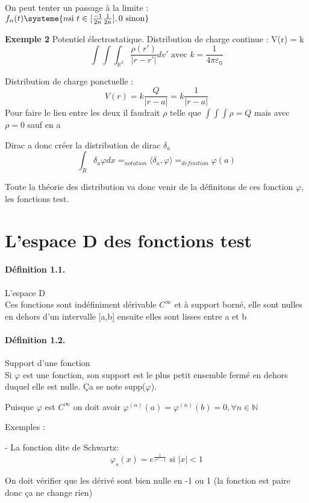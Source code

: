 \documentclass[12pt,a4paper]{report}
\begin{document}
On peut tenter un passage à la limite :\\
\(f_n(t) \systeme{n \text{si } t \in [ \tfrac{-1}{2n} \tfrac{1}{2n} ],0 \text{ sinon} }\)

\textbf{Exemple 2} Potentiel électrostatique.
Distribution de charge continue : V(r) = k 
\[
	\int\int\int_{\mathbb{R}^3} \dfrac{\rho(r')}{\vert r- r'\vert} dv' \text{ avec } k = \dfrac{1}{4\pi\varepsilon_0} 
\]

Distribution de charge ponctuelle :
\[
	V(r) = k\dfrac{Q}{\vert r - a \vert} = k\dfrac{1}{\vert r - a \vert}
\]
Pour faire le lien entre les deux il faudrait \(\rho\) telle que \(\int\int\int \rho = Q\) mais avec \(\rho = 0\) sauf en a

Dirac a donc créer la distribution de dirac \(\delta_a\)
\[
	\int_R \delta_a \varphi dx =_{notation} \langle \delta_a, \varphi \rangle =_{definition} \varphi(a)
\]

Toute la théorie des distribution va donc venir de la définitons de ces fonction $\varphi$, les fonctions test.

\section{L'espace D des fonctions test}

\paragraph{Définition 1.1.} L'espace D\\
Ces fonctions sont indéfiniment dérivable $C^\infty$ et à support borné, elle sont nulles en dehors d'un intervalle [a,b] ensuite elles sont lisses entre a et b

\paragraph{Définition 1.2.} Support d'une fonction\\
Si \(\varphi\) est une fonction, son support est le plus petit ensemble fermé en dehors duquel elle est nulle. Ça se note supp(\(\varphi\)).

Puisque \(\varphi\) est \(C^{\infty}\) on doit avoir \(\varphi^{(n)}(a) = \varphi^{(n)}(b) = 0, \forall n \in \mathbb{N}\)

Exemples : \par
- La fonction dite de Schwartz:
\[
	\varphi_s (x) = e^{\frac{1}{x^2-1} }\text{ si } \vert x \vert < 1
\]

On doit vérifier que les dérivé sont bien nulle en -1 ou 1 (la fonction est paire donc ça ne change rien)
\end{document}
